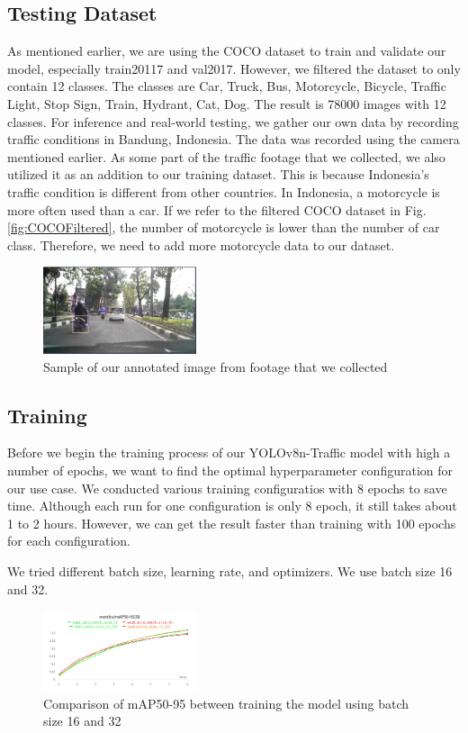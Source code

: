 \documentclass[conference]{IEEEtran}
\begin{document}
\subsection{Testing Dataset}
As mentioned earlier, we are using the COCO dataset to train and validate our model, especially train20117 and val2017. However, we filtered the dataset to only contain 12 classes. The classes are
Car, Truck, Bus, Motorcycle, Bicycle, Traffic Light, Stop Sign, Train, Hydrant, Cat, Dog. The result is 78000 images with 12 classes.
For inference and real-world testing, we gather our own data by recording traffic conditions in Bandung, Indonesia. The data was recorded using the camera mentioned earlier.
As some part of the traffic footage that we collected, we also utilized it as an addition to our training dataset. This is because Indonesia's traffic condition is different from other countries. In Indonesia, a motorcycle is more often used than a car.
If we refer to the filtered COCO dataset in Fig.\ref{fig:COCOFiltered}, the number of motorcycle is lower than the number of car class. Therefore, we need to add more motorcycle data to our dataset.
\begin{figure}[h]
\centering
\includegraphics[width=0.4\textwidth,keepaspectratio]{sample_dataset.png}
\caption{Sample of our annotated image from footage that we collected}
\end{figure}

\subsection{Training}
Before we begin the training process of our YOLOv8n-Traffic model with high a number of epochs, we want to find the optimal hyperparameter configuration for our use case. We conducted various training configuratios with 8 epochs to save time.
Although each run for one configuration is only 8 epoch, it still takes about 1 to 2 hours. However, we can get the result faster than training with 100 epochs for each configuration.

We tried different batch size, learning rate, and optimizers. We use batch size 16 and 32.
\begin{figure}[h]
\centering
\includegraphics[width=0.4\textwidth,keepaspectratio]{mAP_batch_size_comparison.png} %
\caption{Comparison of mAP50-95 between training the model using batch size 16 and 32}
\label{fig:batch_size}
\end{figure}
\end{document}
